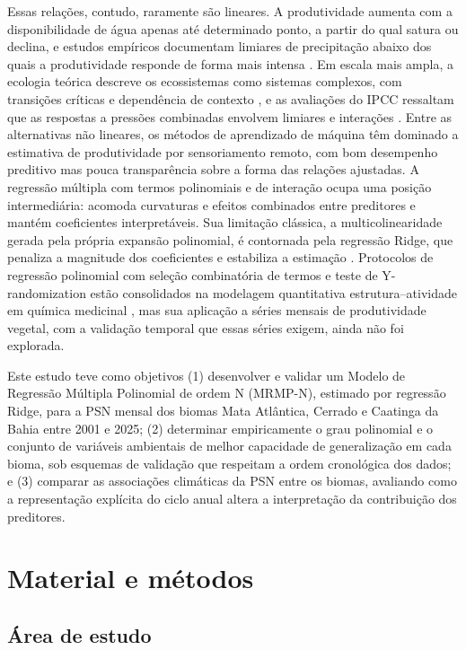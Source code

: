 \documentclass[a4paper,fleqn]{cas-dc}
\begin{document}
Essas relações, contudo, raramente são lineares. A produtividade aumenta com a disponibilidade de água apenas até determinado ponto, a partir do qual satura ou declina, e estudos empíricos documentam limiares de precipitação abaixo dos quais a produtividade responde de forma mais intensa \citep{jin2018,linger2020,mwangi2025}. Em escala mais ampla, a ecologia teórica descreve os ecossistemas como sistemas complexos, com transições críticas e dependência de contexto \citep{levin1998,flores2024}, e as avaliações do IPCC ressaltam que as respostas a pressões combinadas envolvem limiares e interações \citep{ipcc2022}. Entre as alternativas não lineares, os métodos de aprendizado de máquina têm dominado a estimativa de produtividade por sensoriamento remoto, com bom desempenho preditivo mas pouca transparência sobre a forma das relações ajustadas. A regressão múltipla com termos polinomiais e de interação ocupa uma posição intermediária: acomoda curvaturas e efeitos combinados entre preditores e mantém coeficientes interpretáveis. Sua limitação clássica, a multicolinearidade gerada pela própria expansão polinomial, é contornada pela regressão Ridge, que penaliza a magnitude dos coeficientes e estabiliza a estimação \citep{hoerl1970}. Protocolos de regressão polinomial com seleção combinatória de termos e teste de Y-randomization estão consolidados na modelagem quantitativa estrutura--atividade em química medicinal \citep{guimaraes2024}, mas sua aplicação a séries mensais de produtividade vegetal, com a validação temporal que essas séries exigem, ainda não foi explorada.

Este estudo teve como objetivos (1) desenvolver e validar um Modelo de Regressão Múltipla Polinomial de ordem N (MRMP-N), estimado por regressão Ridge, para a PSN mensal dos biomas Mata Atlântica, Cerrado e Caatinga da Bahia entre 2001 e 2025; (2) determinar empiricamente o grau polinomial e o conjunto de variáveis ambientais de melhor capacidade de generalização em cada bioma, sob esquemas de validação que respeitam a ordem cronológica dos dados; e (3) comparar as associações climáticas da PSN entre os biomas, avaliando como a representação explícita do ciclo anual altera a interpretação da contribuição dos preditores.

\section{Material e métodos}\label{sec:methods}

\subsection{Área de estudo}
\end{document}
